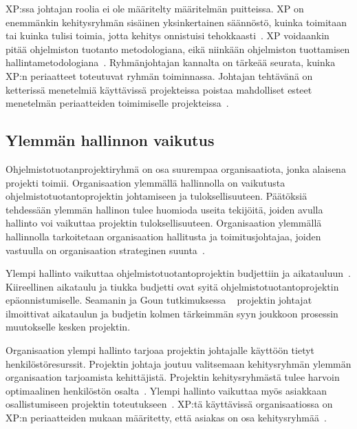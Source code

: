 \documentclass[finnish]{tktltiki2}
\theoremstyle{definition}
\theoremstyle{remark}
\begin{document}
XP:ssa johtajan roolia ei ole määritelty määritelmän puitteissa. XP on enemmänkin kehitysryhmän sisäinen yksinkertainen säännöstö, kuinka toimitaan tai kuinka tulisi toimia, jotta kehitys onnistuisi tehokkaasti~\cite{Augustine:2005:APM:1101779.1101781}. XP voidaankin pitää ohjelmiston tuotanto metodologiana, eikä niinkään ohjelmiston tuottamisen hallintametodologiana~\cite{cohen2004introduction}. Ryhmänjohtajan kannalta on tärkeää seurata, kuinka XP:n periaatteet toteutuvat ryhmän toiminnassa. Johtajan tehtävänä on ketterissä menetelmiä käyttävissä projekteissa poistaa mahdolliset esteet menetelmän periaatteiden toimimiselle projekteissa~\cite{Augustine:2005:APM:1101779.1101781}.





\subsection{Ylemmän hallinnon vaikutus}

Ohjelmistotuotanprojektiryhmä on osa suurempaa organisaatiota, jonka alaisena projekti toimii. Organisaation ylemmällä hallinnolla on vaikutusta ohjelmistotuotantoprojektin johtamiseen ja tuloksellisuuteen. Päätöksiä tehdessään ylemmän hallinon tulee huomioda useita tekijöitä, joiden avulla hallinto voi vaikuttaa projektin tuloksellisuuteen.  Organisaation ylemmällä hallinnolla tarkoitetaan organisaation hallitusta ja toimitusjohtajaa, joiden vastuulla on organisaation strateginen suunta~\cite{McLeod:2011:FAS:1978802.1978803}.

Ylempi hallinto vaikuttaa ohjelmistotuotantoprojektin budjettiin ja aikatauluun~\cite{McLeod:2011:FAS:1978802.1978803}. Kiireellinen aikataulu ja tiukka budjetti ovat syitä ohjelmistotuotantoprojektin epäonnistumiselle. Seamanin ja Goun tutkimuksessa ~\cite{Guo:2008:SSP:1414004.1414046} projektin johtajat ilmoittivat aikataulun ja budjetin kolmen tärkeimmän syyn joukkoon prosessin muutokselle kesken projektin.

Organisaation ylempi hallinto tarjoaa projektin johtajalle käyttöön tietyt henkilöstöresurssit. Projektin johtaja joutuu valitsemaan kehitysryhmän ylemmän organisaation tarjoamista kehittäjistä. Projektin kehitysryhmästä tulee harvoin optimaalinen henkilöstön osalta~\cite{Dhomne:2012:ITL:2382887.2382899}. Ylempi hallinto vaikuttaa myös asiakkaan osallistumiseen projektin toteutukseen~\cite{McLeod:2011:FAS:1978802.1978803}. XP:tä käyttävissä organisaatiossa on XP:n periaatteiden mukaan määritetty, että asiakas on osa kehitysryhmää~\cite{796139}.
\end{document}
